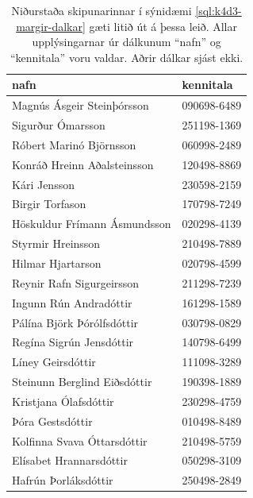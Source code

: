 \begin{table}
\centering
\caption[Niðurstaða margra dálka SELECT]{Niðurstaða skipunarinnar í sýnidæmi \ref{sql:k4d3-margir-dalkar} gæti litið út á þessa leið. Allar upplýsingarnar úr dálkunum ``nafn'' og ``kennitala'' voru valdar. Aðrir dálkar sjást ekki.}
\label{tafla:margir-dalkar-nidurstada}
\begin{tabular}{ll}
\toprule
nafn&kennitala\\
\midrule
Magnús Ásgeir Steinþórsson&090698-6489\\
Sigurður Ómarsson&251198-1369\\
Róbert Marinó Björnsson&060998-2489\\
Konráð Hreinn Aðalsteinsson&120498-8869\\
Kári Jensson&230598-2159\\
Birgir Torfason&170798-7249\\
Höskuldur Frímann Ásmundsson&020298-4139\\
Styrmir Hreinsson&210498-7889\\
Hilmar Hjartarson&020798-4599\\
Reynir Rafn Sigurgeirsson&211298-7239\\
Ingunn Rún Andradóttir&161298-1589\\
Pálína Björk Þórólfsdóttir&030798-0829\\
Regína Sigrún Jensdóttir&140798-6499\\
Líney Geirsdóttir&111098-3289\\
Steinunn Berglind Eiðsdóttir&190398-1889\\
Kristjana Ólafsdóttir&230298-4759\\
Þóra Gestsdóttir&010498-8489\\
Kolfinna Svava Óttarsdóttir&210498-5759\\
Elísabet Hrannarsdóttir&050298-3109\\
Hafrún Þorláksdóttir&250498-2849\\
\bottomrule
\end{tabular}
\end{table}

